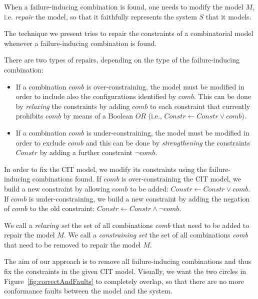 \begin{tikzborder}{\cite{Gargantini16:validation}}
\begin{tikzborder}{\cite{gargantini_combinatorial_2017}}
When a failure-inducing combination is found, one needs to modify the model $M$, i.e. \emph{repair} the model, so that it faithfully represents the system $S$ that it models. 
\be

The technique we present tries to repair the constraints of a combinatorial model whenever a failure-inducing combination is found. 

\bb
There are two types of repairs, depending on the type of the failure-inducing combination:
\begin{itemize}
	\item If a combination $comb$ is over-constraining, the model must be modified in order to include also the configurations identified by $comb$. This can be done by \emph{relaxing} the constraints by adding $comb$ to each constraint that currently prohibits $comb$ by means of a Boolean $\textit{OR}$ (i.e., $\mathit{Constr} \leftarrow \mathit{Constr} \vee comb$).
	
	\item If a combination $comb$ is under-constraining, the model must be modified in order to exclude $comb$ and this can be done by \emph{strengthening} the constraints $\mathit{Constr}$ by adding a further constraint $\neg comb$.
	
\end{itemize}

In order to fix the CIT model, we modify its constraints using the failure-inducing combinations found. If $comb$ is over-constraining the CIT model, we build a new constraint by allowing $comb$ to be added: $\mathit{Constr} \leftarrow \mathit{Constr} \vee comb$. If $comb$ is under-constraining, we build a new constraint by adding the negation of $comb$ to the old constraint: $\mathit{Constr} \leftarrow \mathit{Constr} \wedge \neg comb$.

\begin{defn}\label{def:modsets}
	We call a \emph{relaxing set} the set of all combinations \emph{comb} that need to be added to repair the model $M$. We call a \emph{constraining set} the set of all combinations \emph{comb} that need to be removed to repair the model $M$. 
\end{defn}

The aim of our approach is to remove all failure-inducing combinations and thus fix the constraints in the given CIT model. Visually, we want the two circles in Figure~\ref{fig:correctAndFaults} to completely overlap, so that there are no more conformance faults between the model and the system.


\end{tikzborder}
\end{tikzborder}
